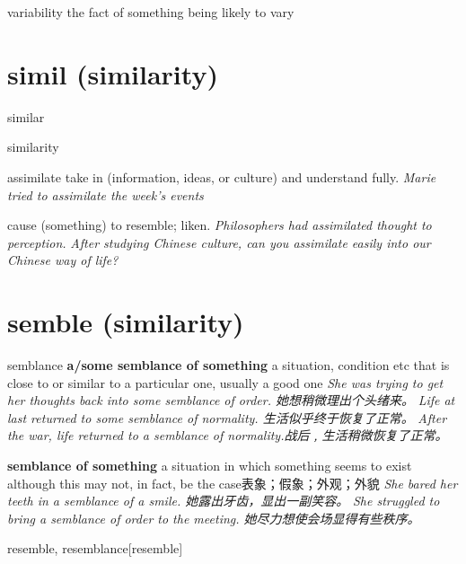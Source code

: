 \begin{RefWord}{variability}
    the fact of something being likely to vary
\end{RefWord}

\section{simil (similarity)}

\begin{RefWord}{similar}
\end{RefWord}

\begin{RefWord}{similarity}
\end{RefWord}

\begin{RefWord}{assimilate}
    take in (information, ideas, or culture) and understand fully.
\textit{Marie tried to assimilate the week's events}

cause (something) to resemble; liken.
\textit{Philosophers had assimilated thought to perception.}
\textit{After studying Chinese culture, can you assimilate easily into our Chinese way of life?}

\end{RefWord}

\section{semble (similarity)}

\begin{RefWord}{semblance}
    \textbf{a/some semblance of something} a situation, condition etc that is close to or similar to a particular one, usually a good one
    \textit{She was trying to get her thoughts back into some semblance of order. 她想稍微理出个头绪来。}
    \textit{Life at last returned to some semblance of normality. 生活似乎终于恢复了正常。}
    \textit{After the war, life returned to a semblance of normality.战后﹐生活稍微恢复了正常。}

    \textbf{semblance of something} a situation in which something seems to exist although this may not, in fact, be the case表象；假象；外观；外貌
    \textit{She bared her teeth in a semblance of a smile. 她露出牙齿，显出一副笑容。}
    \textit{She struggled to bring a semblance of order to the meeting. 她尽力想使会场显得有些秩序。}
\end{RefWord}

\begin{RefWord}{resemble, resemblance}[resemble]
\end{RefWord}

